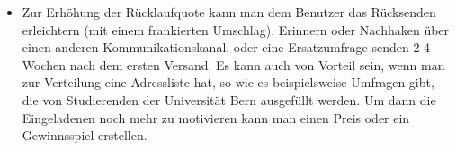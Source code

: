 \begin{itemize}
    \item Zur Erhöhung der Rücklaufquote kann man dem Benutzer das Rücksenden erleichtern (mit einem
    frankierten Umschlag), Erinnern oder Nachhaken über einen anderen Kommunikationskanal, oder eine
    Ersatzumfrage senden 2-4 Wochen nach dem ersten Versand.
    Es kann auch von Vorteil sein, wenn man zur Verteilung eine Adressliste hat, so wie es beispielsweise
    Umfragen gibt, die von Studierenden der Universität Bern ausgefüllt werden. Um dann
    die Eingeladenen noch mehr zu motivieren kann man einen Preis oder ein Gewinnsspiel erstellen.
    
\end{itemize}

 






 

